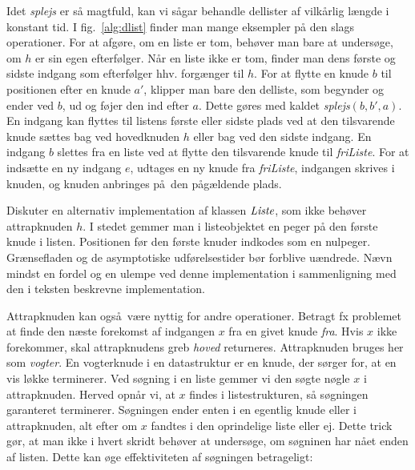 Idet \emph{splejs} er så magtfuld, kan vi sågar behandle dellister af vilkårlig længde i konstant tid.
I fig.~\ref{alg:dlist} finder man mange eksempler på den slags operationer.
For at afgøre, om en liste er tom, behøver man bare at undersøge, om $h$ er sin egen efterfølger.
Når en liste ikke er tom, finder man dens første og sidste indgang som efterfølger hhv. forgænger til $h$.
For at flytte en knude $b$ til positionen efter en knude $a'$, klipper man bare den delliste, som begynder og ender ved $b$, ud og føjer den ind efter $a$.
Dette gøres med kaldet \emph{splejs}$(b,b', a)$.
En indgang kan flyttes til listens første eller sidste plads ved at den tilsvarende knude sættes bag ved hovedknuden $h$ eller bag ved den sidste indgang.
En indgang $b$ slettes fra en liste ved at flytte den tilsvarende knude til \emph{friListe}.
For at indsætte en ny indgang $e$, 
udtages en ny knude fra \emph{friListe}, indgangen skrives i knuden, og knuden anbringes på den pågældende plads.

\begin{exerc}
  Diskuter en alternativ implementation af klassen $\operatorname{\emph{Liste}}$, som ikke behøver attrapknuden $h$.
  I stedet gemmer man i listeobjektet en peger på den første knude i listen.
  Positionen før den første knuder indkodes som en nulpeger.
  Grænsefladen og de asymptotiske udførelsestider bør forblive uændrede.
  Nævn mindst en fordel og en ulempe ved denne implementation i sammenligning med den i teksten beskrevne implementation.
\end{exerc}

Attrapknuden kan også være nyttig for andre operationer. 
Betragt fx problemet at finde den næste forekomst af indgangen $x$ fra en givet knude \emph{fra}.
  Hvis $x$ ikke forekommer, skal attrapknudens greb \emph{hoved} returneres.
  Attrapknuden bruges her som \emph{vogter}.
  En vogterknude i en datastruktur er en knude, der sørger for, at en vis løkke terminerer.
  Ved søgning i en liste gemmer vi den søgte nøgle $x$ i attrapknuden.
  Herved opnår vi, at $x$ findes i listestrukturen, så søgningen garanteret terminerer.
  Søgningen ender enten i en egentlig knude eller i attrapknuden, alt efter om $x$ fandtes i den oprindelige liste eller ej.
  Dette trick gør, at man ikke i hvert skridt behøver at undersøge, om søgninen har nået enden af listen.
  Dette kan øge effektiviteten af søgningen betrageligt:

